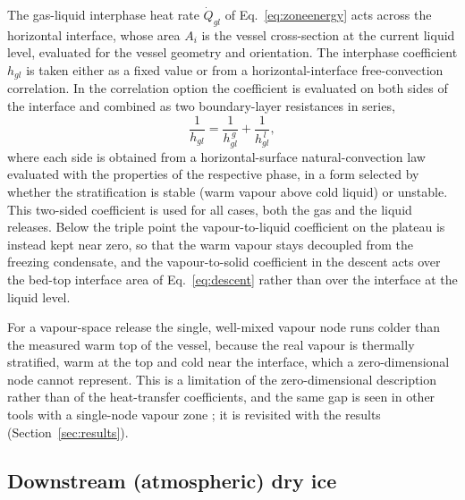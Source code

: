 \documentclass[5p,authoryear]{elsarticle}
\begin{document}
The gas-liquid interphase heat rate $\dot Q_{gl}$ of Eq.~\eqref{eq:zoneenergy} acts across the
horizontal interface, whose area $A_i$ is the vessel cross-section at the current liquid level,
evaluated for the vessel geometry and orientation. The interphase coefficient $h_{gl}$ is taken
either as a fixed value or from a horizontal-interface free-convection correlation. In the
correlation option the coefficient is evaluated on both sides of the interface and combined as two
boundary-layer resistances in series,
\begin{equation}
\label{eq:hgl}
\frac{1}{h_{gl}} = \frac{1}{h_{gl}^{\,g}} + \frac{1}{h_{gl}^{\,l}},
\end{equation}
where each side is obtained from a horizontal-surface natural-convection law evaluated with the
properties of the respective phase, in a form selected by whether the stratification is stable
(warm vapour above cold liquid) or unstable. This two-sided coefficient is used for all cases, both
the gas and the liquid releases. Below the triple point the vapour-to-liquid coefficient on the
plateau is instead kept near zero, so that the warm vapour stays decoupled from the freezing
condensate, and
the vapour-to-solid coefficient in the descent acts over the bed-top interface area of
Eq.~\eqref{eq:descent} rather than over the interface at the liquid level.

For a vapour-space release the single, well-mixed vapour node runs colder than the measured warm
top of the vessel, because the real vapour is thermally stratified, warm at the top and cold near
the interface, which a zero-dimensional node cannot represent. This is a limitation of the
zero-dimensional description rather than of the heat-transfer coefficients, and the same gap is
seen in other tools with a single-node vapour zone \citep{Vaillant2021}; it is revisited with the
results (Section~\ref{sec:results}).

\subsection{Downstream (atmospheric) dry ice}
\label{sec:atmdryice}
\end{document}
